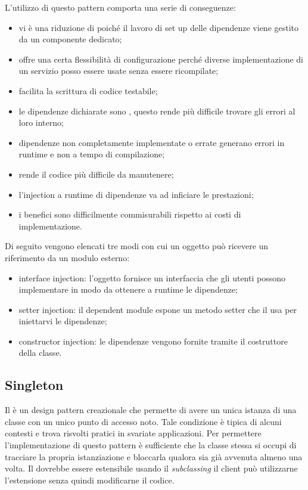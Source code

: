 		L'utilizzo di questo pattern comporta una serie di conseguenze:
		\begin{itemize}
				\item vi è una riduzione di  poiché il lavoro di set up delle dipendenze viene gestito da un componente dedicato;
				\item offre una certa flessibilità di configurazione perché diverse implementazione di un servizio posso essere usate senza essere ricompilate;
				\item facilita la scrittura di codice testabile;
				\item le dipendenze dichiarate sono , questo rende più difficile trovare gli errori al loro interno;
				\item dipendenze non completamente implementate o errate generano errori in runtime e non a tempo di compilazione;
				\item rende il codice più difficile da manutenere;
				\item l'injection a runtime di dipendenze va ad inficiare le prestazioni;
				\item i benefici sono difficilmente commisurabili rispetto ai costi di implementazione.
		\end{itemize}
		
		Di seguito vengono elencati tre modi con cui un oggetto può ricevere un riferimento da un modulo esterno:
		\begin{itemize}
			\item interface injection: l'oggetto fornisce un interfaccia che gli utenti possono implementare in modo da ottenere a runtime le dipendenze;
			\item setter injection: il dependent module espone un metodo setter che il  usa per iniettarvi le dipendenze;
			\item constructor injection: le dipendenze vengono fornite tramite il costruttore della classe.
		\end{itemize}
	
	
	
	
	
	
	
	\subsection{Singleton} %
	Il  è un design pattern creazionale che permette di avere un unica istanza di una classe con un unico punto di accesso noto. Tale condizione è tipica di alcuni contesti e trova risvolti pratici in svariate applicazioni. Per permettere l'implementazione di questo pattern è sufficiente che la classe stessa si occupi di tracciare la propria istanziazione e bloccarla qualora sia già avvenuta almeno una volta. Il  dovrebbe essere estensibile usando il \emph{subclassing} il client può utilizzarne l'estensione senza quindi modificarne il codice.
	
